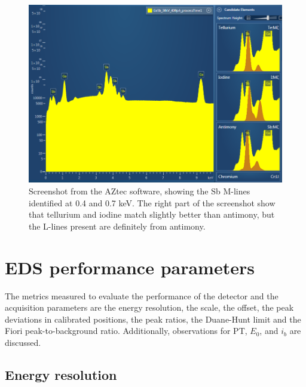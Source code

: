 \begin{figure}[htbp]
    \centering
    \includegraphics[width=0.95\linewidth]{figures/discussion/AZtec_Mlines.png}
    \caption{
        Screenshot from the AZtec software, showing the Sb M-lines identified at 0.4 and 0.7 keV.
        The right part of the screenshot show that tellurium and iodine match slightly better than antimony, but the L-lines present are definitely from antimony.
        }
    \label{fig:discussion:AZtec_Mlines}
\end{figure}

















\section{EDS performance parameters}
\label{discussion:performance}

The metrics measured to evaluate the performance of the detector and the acquisition parameters are the energy resolution, the scale, the offset, the peak deviations in calibrated positions, the peak ratios, the Duane-Hunt limit and the Fiori peak-to-background ratio.
Additionally, observations for PT, $E_0$, and $i_b$ are discussed.



\subsection{Energy resolution}
\label{discussion:energy_resolution}


